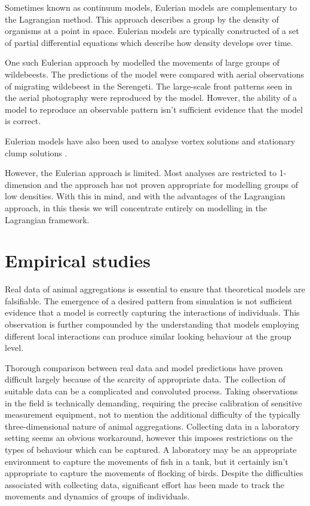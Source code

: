 Sometimes known as continuum models, Eulerian models are complementary to the Lagrangian method. This approach describes a group by the density of organisms at a point in space. Eulerian models are typically constructed of a set of partial differential equations which describe how density develops over time.

One such Eulerian approach by \citet{gueron93} modelled the movements of large groups of wildebeests. The predictions of the model were compared with aerial observations of migrating wildebeest in the Serengeti. The large-scale front patterns seen in the aerial photography were reproduced by the model. However, the ability of a model to reproduce an observable pattern isn't sufficient evidence that the model is correct.

Eulerian models have also been used to analyse vortex solutions \citep{topaz04} and stationary clump solutions \citep{topaz06}.

However, the Eulerian approach is limited. Most analyses are restricted to 1-dimension and the approach has not proven appropriate for modelling groups of low densities. With this in mind, and with the advantages of the Lagrangian approach, in this thesis we will concentrate entirely on modelling in the Lagrangian framework.

\section{Empirical studies}
\label{sec:empirical_studies}

Real data of animal aggregations is essential to ensure that theoretical models are falsifiable. The emergence of a desired pattern from simulation is not sufficient evidence that a model is correctly capturing the interactions of individuals. This observation is further compounded by the understanding that models employing different local interactions can produce similar looking behaviour at the group level.

Thorough comparison between real data and model predictions have proven difficult largely because of the scarcity of appropriate data. The collection of suitable data can be a complicated and convoluted process. Taking observations in the field is technically demanding, requiring the precise calibration of sensitive measurement equipment, not to mention the additional difficulty of the typically three-dimensional nature of animal aggregations. Collecting data in a laboratory setting seems an obvious workaround, however this imposes restrictions on the types of behaviour which can be captured. A laboratory may be an appropriate environment to capture the movements of fish in a tank, but it certainly isn't appropriate to capture the movements of flocking of birds. Despite the difficulties associated with collecting data, significant effort has been made to track the movements and dynamics of groups of individuals.

